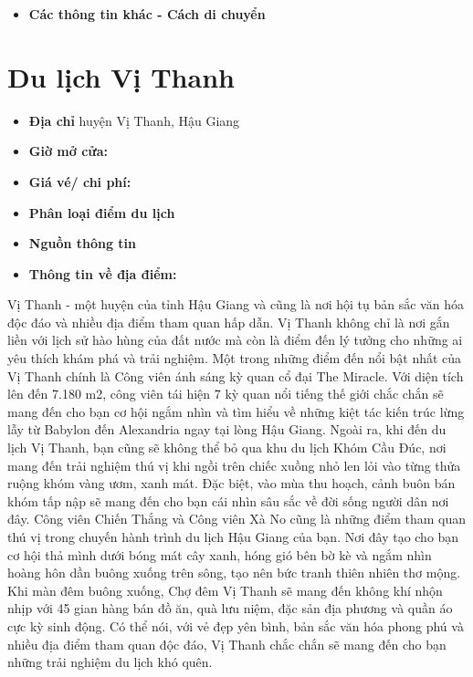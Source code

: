 \documentclass{article}
\begin{document}
\begin{itemize}
    \item{\textbf{Các thông tin khác - Cách di chuyển}}
\end{itemize}

\section{Du lịch Vị Thanh}
\begin{itemize}
    \item{\textbf{Địa chỉ}} huyện Vị Thanh, Hậu Giang
    \item{\textbf{Giờ mở cửa:}}
    \item{\textbf{Giá vé/ chi phí:}}
    \item{\textbf{Phân loại điểm du lịch} }
    \item{\textbf{Nguồn thông tin}}
    \item{\textbf{Thông tin về địa điểm:}}
\end{itemize}
Vị Thanh - một huyện của tỉnh Hậu Giang và cũng là nơi hội tụ bản sắc văn hóa độc đáo và nhiều địa điểm tham quan hấp dẫn. Vị Thanh không chỉ là nơi gắn liền với lịch sử hào hùng của đất nước mà còn là điểm đến lý tưởng cho những ai yêu thích khám phá và trải nghiệm.
Một trong những điểm đến nổi bật nhất của Vị Thanh chính là Công viên ánh sáng kỳ quan cổ đại The Miracle. Với diện tích lên đến 7.180 m2, công viên tái hiện 7 kỳ quan nổi tiếng thế giới chắc chắn sẽ mang đến cho bạn cơ hội ngắm nhìn và tìm hiểu về những kiệt tác kiến trúc lừng lẫy từ Babylon đến Alexandria ngay tại lòng Hậu Giang.
Ngoài ra, khi đến du lịch Vị Thanh, bạn cũng sẽ không thể bỏ qua khu du lịch Khóm Cầu Đúc, nơi mang đến trải nghiệm thú vị khi ngồi trên chiếc xuồng nhỏ len lỏi vào từng thửa ruộng khóm vàng ươm, xanh mát. Đặc biệt, vào mùa thu hoạch, cảnh buôn bán khóm tấp nập sẽ mang đến cho bạn cái nhìn sâu sắc về đời sống người dân nơi đây.
Công viên Chiến Thắng và Công viên Xà No cũng là những điểm tham quan thú vị trong chuyến hành trình du lịch Hậu Giang của bạn. Nơi đây tạo cho bạn cơ hội thả mình dưới bóng mát cây xanh, hóng gió bên bờ kè và ngắm nhìn hoàng hôn dần buông xuống trên sông, tạo nên bức tranh thiên nhiên thơ mộng. Khi màn đêm buông xuống, Chợ đêm Vị Thanh sẽ mang đến không khí nhộn nhịp với 45 gian hàng bán đồ ăn, quà lưu niệm, đặc sản địa phương và quần áo cực kỳ sinh động. Có thể nói, với vẻ đẹp yên bình, bản sắc văn hóa phong phú và nhiều địa điểm tham quan độc đáo, Vị Thanh chắc chắn sẽ mang đến cho bạn những trải nghiệm du lịch khó quên.
\end{document}
